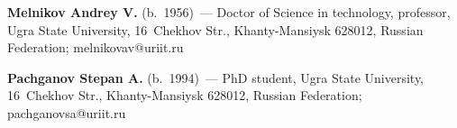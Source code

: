\vspace*{3pt}

\noindent
\textbf{Melnikov Andrey V.} (b.\ 1956)~--- Doctor of Science in technology, 
professor, Ugra State University, 16~Chekhov Str., Khanty-Mansiysk 628012, 
Russian Federation; \mbox{melnikovav@uriit.ru}

\vspace*{3pt}

\noindent
\textbf{Pachganov Stepan A.} (b.\ 1994)~---
 PhD student, Ugra State University, 16~Chekhov Str., Khanty-Mansiysk 628012, 
Russian Federation; \mbox{pachganovsa@uriit.ru}
     
\label{end\stat}

\renewcommand{\bibname}{\protect\rm Литература} 